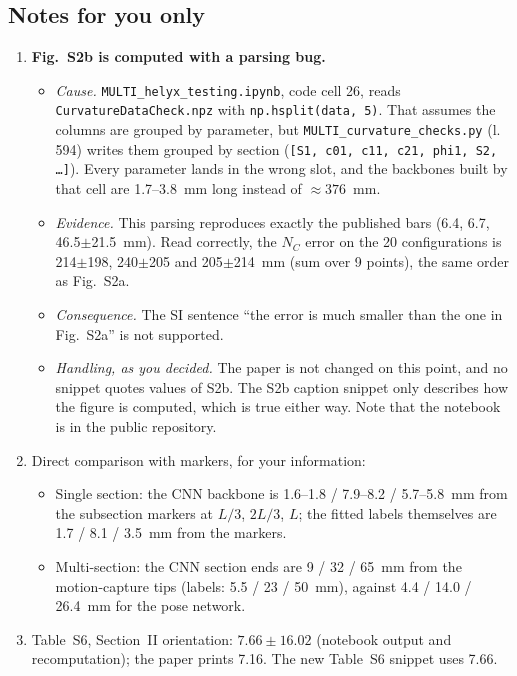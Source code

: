 \documentclass[10pt,a4paper]{article}
\begin{document}
\subsection{Notes for you only}\label{sec:private}
\begin{priv}
\begin{enumerate}
\item \label{priv:s2b}\textbf{Fig.~S2b is computed with a parsing bug.}
\begin{itemize}
\item \emph{Cause.} \texttt{MULTI\_helyx\_testing.ipynb}, code cell 26, reads \texttt{CurvatureDataCheck.npz} with \texttt{np.hsplit(data, 5)}. That assumes the columns are grouped by parameter, but \texttt{MULTI\_curvature\_checks.py} (l.\,594) writes them grouped by section (\texttt{[S1, c01, c11, c21, phi1, S2, \dots]}). Every parameter lands in the wrong slot, and the backbones built by that cell are 1.7--3.8~mm long instead of $\approx 376$~mm.
\item \emph{Evidence.} This parsing reproduces exactly the published bars (6.4, 6.7, 46.5$\pm$21.5~mm). Read correctly, the $N_C$ error on the 20 configurations is 214$\pm$198, 240$\pm$205 and 205$\pm$214~mm (sum over 9 points), the same order as Fig.~S2a.
\item \emph{Consequence.} The SI sentence ``the error is much smaller than the one in Fig.~S2a'' is not supported.
\item \emph{Handling, as you decided.} The paper is not changed on this point, and no snippet quotes values of S2b. The S2b caption snippet only describes how the figure is computed, which is true either way. Note that the notebook is in the public repository.
\end{itemize}
\item Direct comparison with markers, for your information:
\begin{itemize}
\item Single section: the CNN backbone is 1.6--1.8 / 7.9--8.2 / 5.7--5.8~mm from the subsection markers at $L/3$, $2L/3$, $L$; the fitted labels themselves are 1.7 / 8.1 / 3.5~mm from the markers.
\item Multi-section: the CNN section ends are 9 / 32 / 65~mm from the motion-capture tips (labels: 5.5 / 23 / 50~mm), against 4.4 / 14.0 / 26.4~mm for the pose network.
\end{itemize}
\item Table~S6, Section~II orientation: $7.66 \pm 16.02$ (notebook output and recomputation); the paper prints 7.16. The new Table~S6 snippet uses 7.66.

\end{enumerate}
\end{priv}
\end{document}
